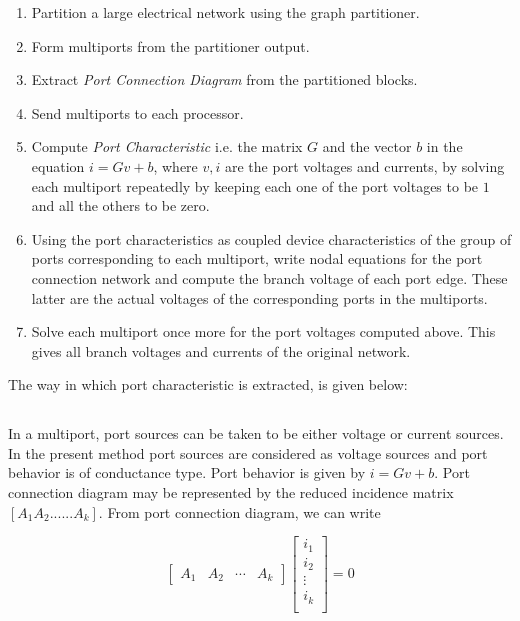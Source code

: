 \documentclass[10pt,psfig,letterpaper,twocolumn]{article}
\begin{document}
\begin{enumerate}
\item Partition a large electrical network using the graph partitioner. 
\item Form multiports from the partitioner output.
\item Extract {\it Port Connection Diagram} from the partitioned blocks.
\item Send multiports to each processor.
\item Compute {\it Port Characteristic} i.e. the matrix $G$ and the vector $b$ in the equation
$i=Gv+b$,  where $v,i$ are the port voltages and currents, by solving each multiport repeatedly by keeping each one of the port
voltages to be $1$ and all the others to be zero.
\item Using the port characteristics as coupled device characteristics of
the group of ports corresponding to each multiport, write nodal equations for 
the port connection network 
and compute the branch voltage of each port edge.
These latter are the actual voltages of the corresponding ports in the 
multiports. 
\item Solve each multiport once more for the port voltages
computed above. This gives all branch voltages and currents of the original
network.
\end{enumerate}
The way in which port characteristic \cite{GAK,NJB,GT} is extracted, is given below: 

\subsection*{}

In a multiport, port sources can be taken to be either voltage or current sources. In the present method port sources are
considered as voltage sources and port behavior is of conductance type. Port behavior is given by
$i=Gv+b$. Port connection diagram may be represented by the reduced incidence matrix 
$[A_{1} A_{2} ...... A_{k}]$. From port connection diagram, we can write

\begin{equation}
\left[\begin{array}{llll}
A_{1} & A_{2} & {\cdots} & A_{k}
\end{array}\right]
\left[\begin{array}{l}
i_{1}\\
i_{2}\\ 
{\vdots}\\
i_{k}\\
\end{array}\right]
= 0
\label{algo1}
\end{equation}
\end{document}
